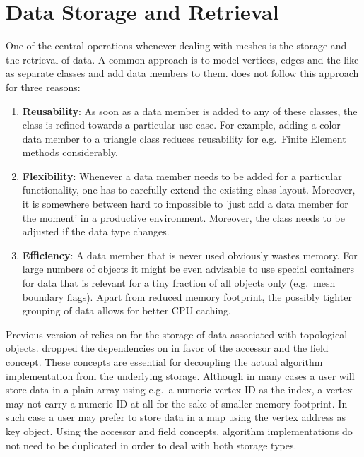 \chapter{Data Storage and Retrieval} \label{chap:data}

One of the central operations whenever dealing with meshes is the storage and the retrieval of data.
A common approach is to model vertices, edges and the like as separate classes and add data members to them.
{\ViennaGrid} does not follow this approach for three reasons:
\begin{enumerate}
 \item \textbf{Reusability}: As soon as a data member is added to any of these classes, the class is refined towards a particular use case. For example, adding a color data member to a triangle class reduces reusability for e.g.~Finite Element methods considerably.
 \item \textbf{Flexibility}: Whenever a data member needs to be added for a particular functionality, one has to carefully extend the existing class layout. Moreover, it is somewhere between hard to impossible to 'just add a data member for the moment' in a productive environment. Moreover, the class needs to be adjusted if the data type changes.
 \item \textbf{Efficiency}: A data member that is never used obviously wastes memory. For large numbers of objects it might be even advisable to use special containers for data that is relevant for a tiny fraction of all objects only (e.g.~mesh boundary flags). Apart from reduced memory footprint, the possibly tighter grouping of data allows for better CPU caching.
\end{enumerate}

Previous version of {\ViennaGrid} relies on {\ViennaData} \cite{ViennaData} for the storage of data associated with topological objects.
{\ViennaGridversion} dropped the dependencies on {\ViennaData} in favor of the accessor and the field concept.
These concepts are essential for decoupling the actual algorithm implementation from the underlying storage.
Although in many cases a user will store data in a plain array using e.g.~a numeric vertex ID as the index, a vertex may not carry a numeric ID at all for the sake of smaller memory footprint.
In such case a user may prefer to store data in a map using the vertex address as key object.
Using the accessor and field concepts, algorithm implementations do not need to be duplicated in order to deal with both storage types.


